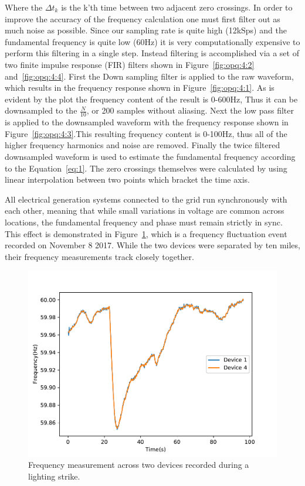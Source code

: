 Where the $\Delta t_{k}$ is the k'th time between two adjacent zero crossings.
In order to improve the accuracy of the frequency calculation one must first filter out as much noise as possible.
Since our sampling rate is quite high (12kSps) and the fundamental frequency is quite low (60Hz) it is very computationally expensive to perform this filtering in a single step.
Instead filtering is accomplished via a set of two finite impulse response (FIR) filters shown in Figure~\ref{fig:opq:4:2} and~\ref{fig:opq:4:4}.
First the Down sampling filter is applied to the raw waveform, which results in the frequency response shown in Figure~\ref{fig:opq:4:1}.
As is evident by the plot the frequency content of the result is 0-600Hz, Thus it can be downsampled to the $\frac{N}{10}$, or 200 samples without aliasing.
Next the low pass filter is applied to the downsampled waveform with the frequency response shown in Figure~\ref{fig:opq:4:3}.This resulting frequency content is 0-100Hz, thus all of the higher frequency harmonics and noise are removed.
Finally the twice filtered downsampled waveform is used to estimate the fundamental frequency according to the Equation~\ref{eq:1}.
The zero crossings themselves were calculated by using linear interpolation between two points which bracket the time axis.

All electrical generation systems connected to the grid run synchronously with each other, meaning that while small variations in voltage are common across locations, the fundamental frequency and phase must remain strictly in sync.
This effect is demonstrated in Figure~\ref{fig:opq:5}, which is a frequency fluctuation event recorded on November 8 2017.
While the two devices were separated by ten miles, their frequency measurements track closely together.

\begin{figure}[h]
	\centering
	\includegraphics[width=0.6\linewidth]{img/frequency_two_devices.pdf}
	\caption{Frequency measurement across two devices recorded during a lighting strike.}
	\label{fig:opq:5}
\end{figure}

